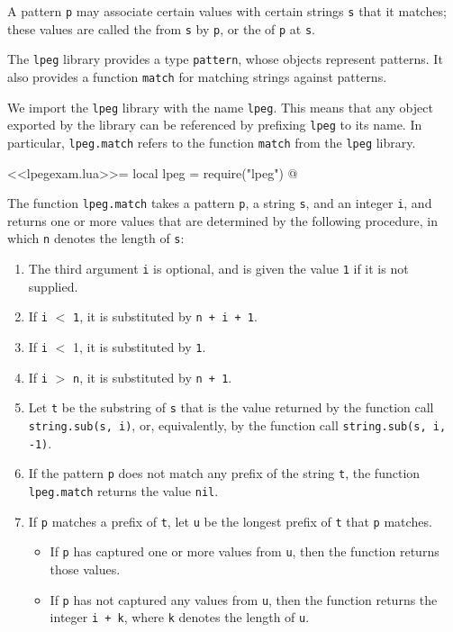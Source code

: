\documentclass{article}
\begin{document}
A pattern \verb|p| may associate certain values with certain strings
\verb|s| that it matches; these values are called the
 from \verb|s| by \verb|p|, or the
 of \verb|p| at \verb|s|.

The \verb|lpeg| library provides a type \verb|pattern|, whose objects
represent patterns.  It also provides a function \verb|match| for
matching strings against patterns.

We import the \verb|lpeg| library with the name \verb|lpeg|.  This
means that any object exported by the library can be referenced by
prefixing \verb|lpeg| to its name.  In particular, \verb|lpeg.match|
refers to the function \verb|match| from the \verb|lpeg| library.
\begin{codechunk}
<<lpegexam.lua>>=
local lpeg = require("lpeg")
@
\end{codechunk}

The function \verb|lpeg.match| takes a pattern \verb|p|, a string
\verb|s|, and an integer \verb|i|, and returns one or more values that
are determined by the following procedure, in which \verb|n| denotes
the length of \verb|s|:
\begin{enumerate}
\item The third argument \verb|i| is optional, and is given the value
  \verb|1| if it is not supplied.
\item If \verb|i| \(<\) \verb|1|, it is substituted by
  \verb|n + i + 1|.
\item If \verb|i| \(<\) 1, it is substituted by \verb|1|.
\item If \verb|i| \(>\) \verb|n|, it is substituted by \verb|n + 1|.
\item Let \verb|t| be the substring of \verb|s| that is the value
  returned by the function call \verb|string.sub(s, i)|, or,
  equivalently, by the function call \verb|string.sub(s, i, -1)|.
\item If the pattern \verb|p| does not match any prefix of the string
  \verb|t|, the function \verb|lpeg.match| returns the value
  \verb|nil|.
\item If \verb|p| matches a prefix of \verb|t|, let \verb|u| be the
  longest prefix of \verb|t| that \verb|p| matches.
  \begin{itemize}
  \item If \verb|p| has captured one or more values from \verb|u|,
    then the function returns those values.
  \item If \verb|p| has not captured any values from \verb|u|, then
    the function returns the integer \verb|i + k|, where  \verb|k|
    denotes the length of \verb|u|.
  \end{itemize}
\end{enumerate}
\end{document}
